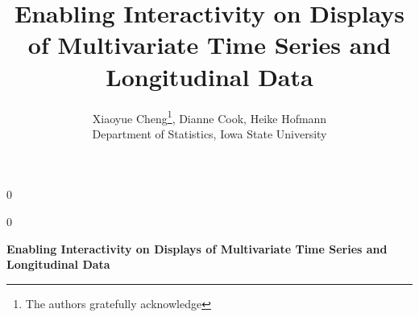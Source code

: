 \documentclass[12pt]{article}
\newcommand{\blind}{0}
\begin{document}
\def\spacingset#1{\renewcommand{\baselinestretch}%
{#1}\small\normalsize} \spacingset{1}


\blind
{
  \title{\bf  Enabling Interactivity on Displays of Multivariate Time Series and Longitudinal Data}
  \author{Xiaoyue Cheng\thanks{
    The authors gratefully acknowledge},\hspace{.2cm}
    Dianne Cook, Heike Hofmann \\
    Department of Statistics, Iowa State University
    }
  \maketitle
} \fi

\blind
{
  \bigskip
  \bigskip
  \bigskip
  \begin{center}
    {\LARGE\bf Enabling Interactivity on Displays of Multivariate Time Series and Longitudinal Data}
\end{center}
  \medskip
} \fi
\end{document}
